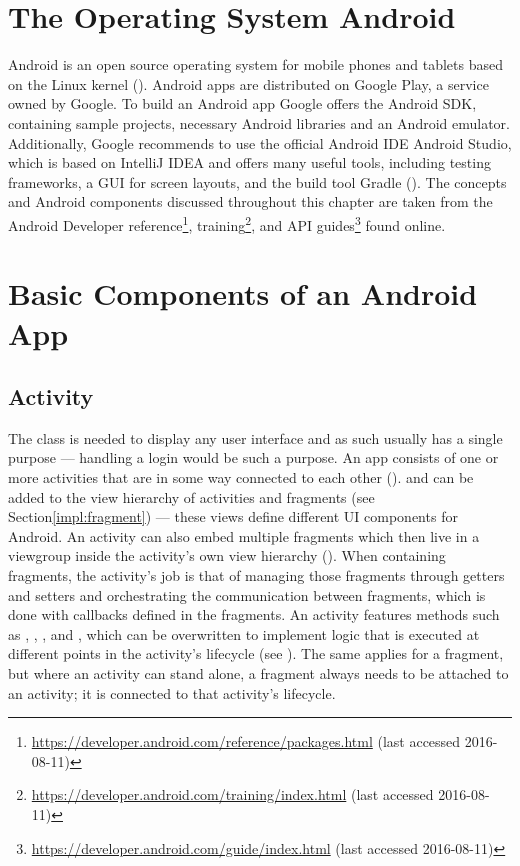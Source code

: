 \section{The Operating System Android}
Android is an open source operating system for mobile phones and tablets based on the Linux kernel (\cite{androiddef}). Android apps are distributed on Google Play, a service owned by Google. To build an Android app Google offers the Android \gls{SDK}, containing sample projects, necessary Android libraries and an Android emulator. Additionally, Google recommends to use the official Android \gls{IDE} Android Studio, which is based on IntelliJ IDEA and offers many useful tools, including testing frameworks, a \gls{GUI} for screen layouts, and the build tool Gradle (\cite{androidstudio}). The concepts and Android components discussed throughout this chapter are taken from the Android Developer reference\footnote{\url{https://developer.android.com/reference/packages.html} (last accessed 2016-08-11)}, training\footnote{\url{https://developer.android.com/training/index.html} (last accessed 2016-08-11)}, and \gls{API} guides\footnote{\url{https://developer.android.com/guide/index.html} (last accessed 2016-08-11)} found online.

\section{Basic Components of an Android App}

\subsection{Activity}
The  class is needed to display any user interface and as such usually has a single purpose --- handling a login would be such a purpose. An app consists of one or more activities that are in some way connected to each other (\cite{activities_in_app}).  and  can be added to the view hierarchy of activities and fragments (see Section\ref{impl:fragment}) --- these views define different UI components for Android. An activity can also embed multiple fragments which then live in a viewgroup inside the activity's own view hierarchy (\cite{androidfragment}). When containing fragments, the activity’s job is that of managing those fragments through getters and setters and orchestrating the communication between fragments, which is done with callbacks defined in the fragments. 
An activity features methods such as , , , and , which can be overwritten to implement logic that is executed at different points in the activity's lifecycle (see ). The same applies for a fragment, but where an activity can stand alone, a fragment always needs to be attached to an activity; it is connected to that activity's lifecycle.

